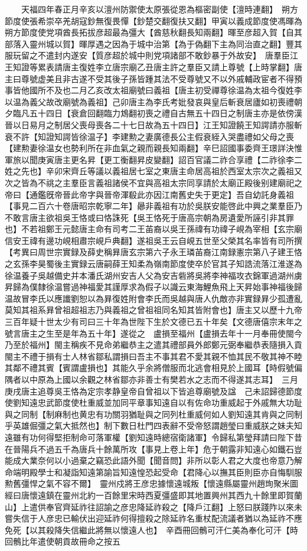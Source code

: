 　　天福四年春正月辛亥以澶州防禦使太原張從恩為樞密副使【澶時連翻】　朔方節度使張希崇卒羌胡寇鈔無復畏憚【鈔楚交翻復扶又翻】甲寅以義成節度使馮暉為朔方節度使党項酋長拓拔彦超最為彊大【酋慈秋翻長知兩翻】暉至彦超入賀【自其部落入靈州城以賀】暉厚遇之因為于城中治第【為于偽翻下主為同治直之翻】豐其服玩留之不遣封内遂安【質彦超於城中則党項諸部不敢鈔暴于外故安】　唐羣臣江王知證等累表請唐主復姓李立唐宗廟乙丑唐主許之羣臣又請上尊號【上時掌翻】唐主曰尊號虚美且非古遂不受其後子孫皆踵其法不受尊號又不以外戚輔政宦者不得預事皆他國所不及也二月乙亥改太祖廟號曰義祖【唐主初受禪尊徐温為太祖今復姓李以温為義父故改廟號為義祖】己卯唐主為李氏考妣發哀與皇后斬衰居廬如初喪禮朝夕臨凡五十四日【衰倉回翻臨力鴆翻初喪之禮自古無五十四日之制唐主亦是依傍漢晉以日易月之制居父喪母喪各二十七日故為五十四日】江王知證饒王知諤請亦服斬衰不許【知證知諤皆徐温子】李建勲之妻廣德長公主假衰絰入哭盡禮如父母之喪【建勲妻徐温女也勢利所在非血氣之親而親長知兩翻】辛巳詔國事委齊王璟詳決惟軍旅以聞庚寅唐主更名昇【更工衡翻昇皮變翻】詔百官議二祚合享禮【二祚徐李二姓之先也】辛卯宋齊丘等議以義祖居七室之東唐主命居高祖於西室太宗次之義祖又次之皆為不祧之主羣臣言義祖諸侯不宜與高祖太宗同享請於太廟正殿後别建廟祀之帝曰【通鑑旣帝晉此帝字與晉帝渾殽此亦因江南舊史失于更定】吾自幼託身義祖【事見二百六十卷唐昭宗乾寧二年】曏非義祖有功於吳朕安能啓此中興之業羣臣乃不敢言唐主欲祖吳王恪或曰恪誅死【吳王恪死于唐高宗朝為房遺愛所誣引非其罪也】不若祖鄭王元懿唐主命有司考二王苖裔以吳王孫禕有功禕子峴為宰相【玄宗廟信安王禕有邊功峴相肅宗峴戶典翻】遂祖吳王云自峴五世至父榮其名率皆有司所撰　【考異曰周世宗實録及薛史稱昪唐玄宗第六子永王璘苖裔江南録憲宗第八子建王恪之玄孫李昊蜀後主實録云唐嗣薛王知柔為嶺南節度使卒於官其子知誥流落江淮遂為徐温養子吳越備史并本潘氏湖州安吉人父為安吉砦將吳將李神福攻衣錦軍過湖州虜昇歸為僕隸徐温嘗過神福愛其謹厚求為假子以識云東海鯉魚飛上天昇始事神福後歸温故冒李氏以應䜟劉恕以為昪復姓附會李氏而吳越與唐人仇敵亦非實録昪少孤遭亂莫知其祖系昪曾祖超祖志乃與義祖之曾祖祖同名知其皆附會也】唐主又以歷十九帝三百年疑十世太少有司曰三十年為世陛下生於文德已五十年矣【文德唐僖宗末年之號言唐主之生至是年為五十年】遂從之　盧損至福州【盧損去年十一月奉冊使閩今乃至於福州】閩主稱疾不見命弟繼恭主之遣其禮部員外郎鄭元弼奉繼恭表隨損入貢閩主不禮于損有士人林省鄒私謂損曰吾主不事其君不愛其親不恤其民不敬其神不睦其鄰不禮其賓【賓謂盧損也】其能久乎余將僧服而北逃會相見於上國耳【時假號偏隅者以中原為上國以余觀之林省鄒亦非善士有樊若水之志而不得遂其志耳】　三月庚戌唐主追尊吳王恪為定宗孝静皇帝自曾祖以下皆追尊廟號及諡　己未詔歸德節度使劉知遠忠武節度使杜重威並加同平章事知遠自以有佐命功重威起于外戚無大功耻與之同制【制麻制也黄忠有功關羽猶耻與之同列杜重威何如人劉知遠其肯與之同制乎英雄倔彊之氣大抵然也】制下數日杜門四表辭不受帝怒謂趙瑩曰重威朕之妹夫知遠雖有功何得堅拒制命可落軍權【劉知遠時總宿衛諸軍】令歸私第瑩拜請曰陛下昔在晉陽兵不過五千為唐兵十餘萬所攻【事見上卷上年】危于朝露非知遠心如鐵石豈能成大業奈何以小過棄之竊恐此語外聞【聞音問】非所以彰人君之大度也帝意乃解命端明殿學士和凝詣知遠第諭旨知遠惶恐起受命【君降心以撫其臣則臣亦自悔馴服勲舊彊悍之氣不容不爾】　靈州戍將王彦忠據懷遠城叛【懷遠縣屬靈州趙珣聚米圖經曰唐懷遠鎮在靈州北約一百餘里宋時西夏彊盛即其地置興州其西九十餘里即賀蘭山】上遣供奉官齊延祚往詔諭之彦忠降延祚殺之【降戶江翻】上怒曰朕踐阼以來未嘗失信于人彦忠已輸伏出迎延祚何得擅殺之除延祚名重杖配流議者猶以為延祚不應免死【以其殺降失信繼此將無以懷遠人也】　辛酉冊回鶻可汗仁美為奉化可汗【時回鶻比年遣使朝貢故冊命之按五